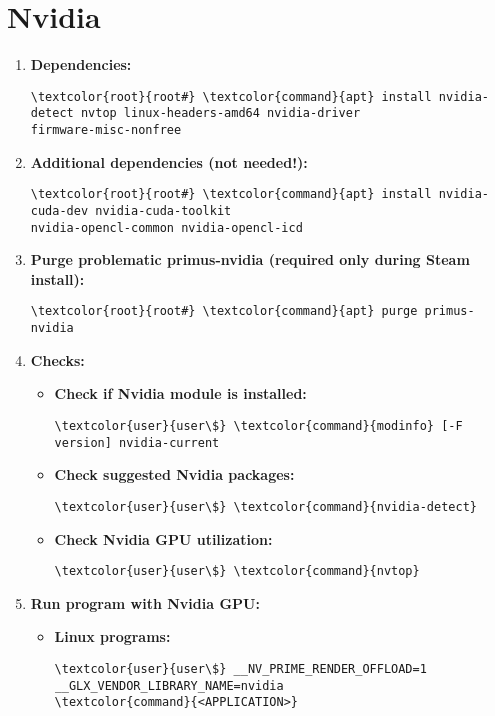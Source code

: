 \documentclass[10pt, a4paper, onecolumn, openany]{book} %
\begin{document}
\section{Nvidia}
\begin{enumerate}
    \item \textbf{Dependencies:}
\begin{Verbatim}[commandchars=\\\{\}]
\textcolor{root}{root#} \textcolor{command}{apt} install nvidia-detect nvtop linux-headers-amd64 nvidia-driver 
firmware-misc-nonfree
\end{Verbatim}    
    \item \textbf{Additional dependencies (\textbf{not needed!}):}
\begin{Verbatim}[commandchars=\\\{\}]
\textcolor{root}{root#} \textcolor{command}{apt} install nvidia-cuda-dev nvidia-cuda-toolkit 
nvidia-opencl-common nvidia-opencl-icd
\end{Verbatim}
    \item \textbf{Purge problematic primus-nvidia (required only during Steam install):}
\begin{Verbatim}[commandchars=\\\{\}]
\textcolor{root}{root#} \textcolor{command}{apt} purge primus-nvidia
\end{Verbatim}
    \item \textbf{Checks:}
\begin{itemize}
    \item \textbf{Check if Nvidia module is installed:}
\begin{Verbatim}[commandchars=\\\{\}]
\textcolor{user}{user\$} \textcolor{command}{modinfo} [-F version] nvidia-current
\end{Verbatim}
    \item \textbf{Check suggested Nvidia packages:}
\begin{Verbatim}[commandchars=\\\{\}]
\textcolor{user}{user\$} \textcolor{command}{nvidia-detect}
\end{Verbatim}
    \item \textbf{Check Nvidia GPU utilization:}
\begin{Verbatim}[commandchars=\\\{\}]
\textcolor{user}{user\$} \textcolor{command}{nvtop}
\end{Verbatim}
\end{itemize}
    \item \textbf{Run program with Nvidia GPU:}
\begin{itemize}
    \item \textbf{Linux programs:}
\begin{Verbatim}[commandchars=\\\{\}]
\textcolor{user}{user\$} __NV_PRIME_RENDER_OFFLOAD=1 __GLX_VENDOR_LIBRARY_NAME=nvidia 
\textcolor{command}{<APPLICATION>}
\end{Verbatim}
\end{itemize}
\end{enumerate}
\end{document}
